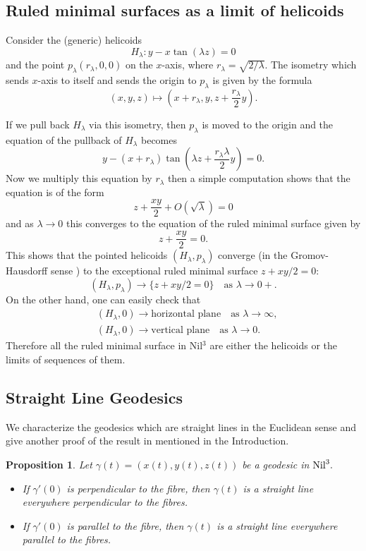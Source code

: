 \documentclass[11pt]{amsart}
\newtheorem{prop}{Proposition}[section]
\begin{document}
\subsection{Ruled minimal surfaces as a limit of helicoids}  Consider the (generic) helicoids
$$H_{\lambda}: y - x\tan (\lambda z)=0$$ and the point
$p_{\lambda}(r_{\lambda},0,0)$ on the $x$-axis, where
$r_{\lambda}=\sqrt{2/\lambda}$. The isometry which sends $x$-axis
to itself and sends the origin to $p_{\lambda}$ is given by the
formula
\[
(x,y,z)\mapsto\left(x+r_{\lambda},y,z+\frac{r_\lambda}2y \right).
\]

If we pull back $H_{\lambda}$ via this isometry, then
$p_{\lambda}$ is moved to the origin and the equation of the
pullback of $H_{\lambda}$ becomes
\[
y-(x+r_{\lambda})\tan\left(\lambda z+\frac{r_{\lambda}\lambda}2
y\right) =0.
\]
Now we multiply this equation by $r_\lambda$ then a simple
computation shows that the equation is of the form
\[
z+\frac{xy}2+O(\sqrt{\lambda})=0
\]
and as $\lambda\to0$ this converges to the equation of the ruled
minimal surface given by
\[
z+\frac{xy}2=0.
\]
This shows that the pointed helicoids $(H_{\lambda},p_{\lambda})$
converge (in the Gromov-Hausdorff sense \cite{G}) to the
exceptional ruled minimal surface $z+xy/2=0$:
$$
(H_\lambda,p_\lambda)\to \{z+xy/2=0\} \quad\text{as }\lambda\to
0+.$$ On the other hand, one can easily check that
\begin{align*}
&(H_\lambda,0)\to \text{horizontal plane}\quad
\text{as }\lambda\to \infty,\\
&(H_\lambda,0)\to\text{vertical plane}\quad \text{as }\lambda\to
0.
\end{align*}
Therefore all the ruled minimal surface in Nil$^3$ are either the
helicoids or the limits of sequences of them.

\subsection{Straight Line Geodesics} We characterize the
geodesics which are straight lines in the Euclidean sense and give
another proof of the result in \cite{BS} mentioned in the
Introduction.

\begin{prop}\label{thm:straight}
Let $\gamma(t)=(x(t), y(t), z(t))$ be a geodesic in $\text{\rm
Nil}^3.$
\begin{itemize}
\item[(1)] If $\gamma'(0)$ is perpendicular to the fibre, then
$\gamma(t)$ is a straight line everywhere perpendicular to the
fibres. \item[(2)] If $\gamma'(0)$ is parallel to the fibre, then
$\gamma(t)$ is a straight line everywhere parallel to the fibres.
\end{itemize}
\end{prop}
\end{document}
